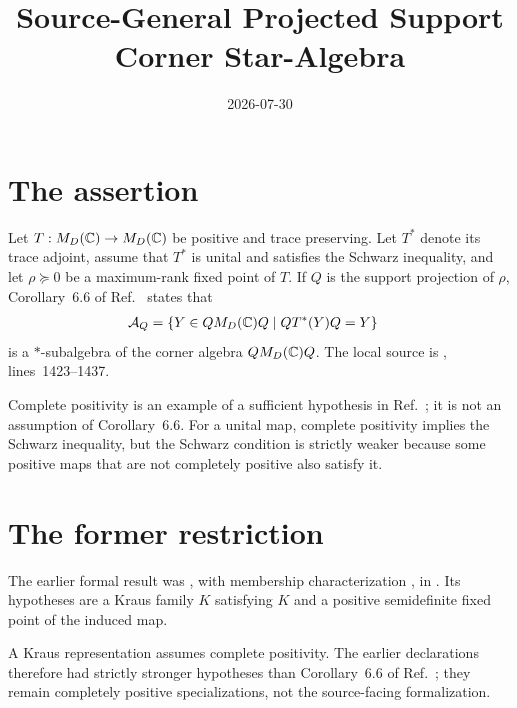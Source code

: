 \documentclass[11pt]{article}
\title{Source-General Projected Support Corner Star-Algebra}
\author{}
\date{2026-07-30}
\begin{document}
\maketitle
{}

\section{The assertion}

Let $T:M_{D}(\mathbb{C})\to M_{D}(\mathbb{C})$ be positive and trace preserving. Let $T^*$ denote
its trace adjoint, assume that $T^*$ is unital and satisfies the Schwarz
inequality, and let $\rho\succeq0$ be a maximum-rank fixed point of $T$. If
$Q$ is the support projection of $\rho$, Corollary~6.6 of
Ref.~\cite{Wolf2012Quantum} states that
\begin{align}
    \mathcal A_Q
        &=
        \left\{Y\in QM_{D}(\mathbb{C})Q
            \mathrel{}\middle|\mathrel{}
            QT^*(Y)Q=Y\right\}
    \label{eq:wolf_cor66_kraus_hypothesis_restriction_corner_fixed_set}
\end{align}
is a $*$-subalgebra of the corner algebra $QM_{D}(\mathbb{C})Q$. The local source is
,
lines~1423--1437.

Complete positivity is an example of a sufficient hypothesis in
Ref.~\cite{Wolf2012Quantum}; it is not an assumption of Corollary~6.6. For a
unital map, complete positivity implies the Schwarz inequality, but the
Schwarz condition is strictly weaker because some positive maps that are not
completely positive also satisfy it.

\section{The former restriction}

The earlier formal result was
, with membership
characterization
, in
. Its hypotheses are
a Kraus family $K$ satisfying  $K$ and a positive semidefinite
fixed point of the induced map.

A Kraus representation assumes complete positivity. The earlier declarations
therefore had strictly stronger hypotheses than Corollary~6.6 of
Ref.~\cite{Wolf2012Quantum}; they remain completely positive
specializations, not the source-facing formalization.
\end{document}
